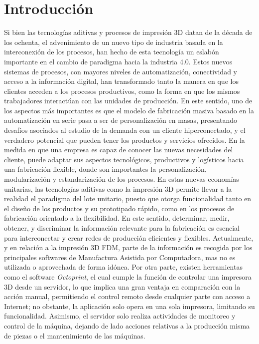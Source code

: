 \chapter{Introducci\'on}
\label{cap:intro}

Si bien las tecnologías aditivas y procesos de impresión 3D datan de la década de los ochenta, el advenimiento de un nuevo tipo de industria basada en la interconexión de los procesos, han hecho de esta tecnología un eslabón importante en el cambio de paradigma hacia la industria 4.0. Estos nuevos sistemas de procesos, con mayores niveles de automatización, conectividad y acceso a la información digital, han transformado tanto la manera en que los clientes acceden a los procesos productivos, como la forma en que los mismos trabajadores interactúan con las unidades de producción. En este sentido, uno de los aspectos más importantes es que el modelo de fabricación masiva basado en la automatización en serie pasa a ser de personalización en masas, presentando desafíos asociados al estudio de la demanda con un cliente hiperconectado, y el verdadero potencial que pueden tener los productos y servicios ofrecidos. En la medida en que una empresa es capaz de conocer las nuevas necesidades del cliente, puede adaptar sus aspectos tecnológicos, productivos y logísticos hacia una fabricación flexible, donde son importantes la personalización, modularización y estandarización de los procesos. En estas nuevas economías unitarias, las tecnologías aditivas como la impresión 3D permite llevar a la realidad el paradigma del lote unitario, puesto que otorga funcionalidad tanto en el diseño de los productos y su prototipado rápido, como en los procesos de fabricación orientado a la flexibilidad.  En este sentido, determinar, medir, obtener, y discriminar la información relevante para la fabricación es esencial para interconectar y crear redes de producción eficientes y flexibles. Actualmente, y en relación a la impresión 3D FDM, parte de la información es recogida por los principales softwares de Manufactura Asistida por Computadora, mas no es utilizada o aprovechada de forma idónea. Por otra parte, existen herramientas como el software \textit{Octoprint}, el cual cumple la función de controlar una impresora 3D desde un servidor, lo que implica una gran ventaja en comparación con la acción manual, permitiendo el control remoto desde cualquier parte con acceso a Internet; no obstante, la aplicación solo opera en una sola impresora, limitando su funcionalidad. Asimismo, el servidor solo realiza actividades de monitoreo y control de la máquina, dejando de lado acciones relativas a la producción misma de piezas o el mantenimiento de las máquinas. \\      
